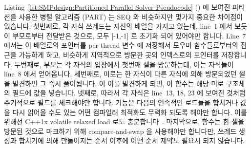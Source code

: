 Listing~\ref{lst:SMPdesign:Partitioned Parallel Solver Pseudocode}
() 에 보여진 파티션을 사용한 병렬 알고리즘 (PART) 는 SEQ 와
비슷하지만 몇가지 중요한 차이점이 있습니다.
첫번째로, 각 자식 쓰레드는 자신의  배열을 가지고 있는데, line~1
에서 보듯이 부모로부터 전달받은 것으로, 모두 [-1,-1] 로 초기화 되어 있어야만
합니다.
Line~7 에서는 이 배열로의 포인터를 per-thread 변수  에 저장해서
도우미 함수들로부터의 접근을 가능하게 하고, 비슷하게 지역적으로 방문한 곳의
인덱스로의 포인터를 저장합니다.
두번째로, 부모는 각 자식의 입장에서 첫번째 셀을 방문하는데, 이는 자식들이
line~8 에서 얻어옵니다.
세번째로, 미로는 한 자식이 다른 자식에 의해 방문되었던 셀을 발견하면 그 즉시
풀이됩니다.
 이 이를 발견하게 되면, 이 함수는 해당 미로 구조체의
 필드에 값을 넣습니다.
넷째로, 따라서 각 자식은 line~13, 18, 23 에 보여진 것처럼 주기적으로
 필드를 체크해야만 합니다.
 기능은 다음의 연속적인 로드들을 합치거나 값을 다시 읽어올
수도 있는 어떤 컴파일러 최적화도 무력화 되도록 해야만 합니다.
이를 위해선 C++1x volatile relaxed load 로도
충분합니다~\cite{PeteBecker2011N3242}.
마지막으로,  함수는 한 셀을 방문된 것으로
마크하기 위해 compare-and-swap 을 사용해야만 합니다만, 쓰레드 생성과 합치기에
의해 만들어지는 순서 이후에 어떤 순서 제약도 필요시 되지 않습니다.

